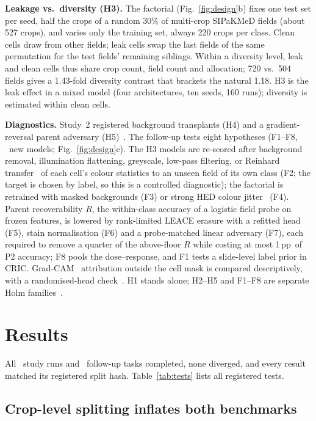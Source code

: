 \documentclass{article}
\newcommand{\pp}{\,pp}
\begin{document}
\textbf{Leakage vs.\ diversity (H3).} The factorial (Fig.~\ref{fig:design}b) fixes one test set per seed, half the crops of a random 30\% of multi-crop SIPaKMeD fields (about 527 crops), and varies only the training set, always 220 crops per class. Clean cells draw from other fields; leak cells swap the last fields of the same permutation for the test fields' remaining siblings. Within a diversity level, leak and clean cells thus share crop count, field count and allocation; 720 vs.\ 504 fields gives a 1.43-fold diversity contrast that brackets the natural 1.18. H3 is the leak effect in a mixed model (four architectures, ten seeds, 160 runs); diversity is estimated within clean cells.

\textbf{Diagnostics.} Study~2 registered background transplants (H4) and a gradient-reversal parent adversary (H5)~\cite{ganin2016dann}. The follow-up tests eight hypotheses (F1--F8, \RecFollowTrainRuns\ new models; Fig.~\ref{fig:design}c). The H3 models are re-scored after background removal, illumination flattening, greyscale, low-pass filtering, or Reinhard transfer~\cite{reinhard2001color} of each cell's colour statistics to an unseen field of its own class (F2; the target is chosen by label, so this is a controlled diagnostic); the factorial is retrained with masked backgrounds (F3) or strong HED colour jitter~\cite{tellez2019quantifying} (F4). Parent recoverability $R$, the within-class accuracy of a logistic field probe on frozen features, is lowered by rank-limited LEACE erasure with a refitted head~\cite{belrose2023leace} (F5), stain normalisation (F6) and a probe-matched linear adversary (F7), each required to remove a quarter of the above-floor $R$ while costing at most 1\pp\ of P2 accuracy; F8 pools the dose--response, and F1 tests a slide-level label prior in CRIC. Grad-CAM~\cite{selvaraju2017gradcam} attribution outside the cell mask is compared descriptively, with a randomised-head check~\cite{adebayo2018sanity}. H1 stands alone; H2--H5 and F1--F8 are separate Holm families~\cite{holm1979}.


\section{Results}
\label{sec:results}

All \RecStudyTwoRuns\ study runs and \RecFollowTasks\ follow-up tasks completed, none diverged, and every result matched its registered split hash. Table~\ref{tab:tests} lists all registered tests.

\subsection{Crop-level splitting inflates both benchmarks}
\label{sec:res-consequence}
\end{document}
